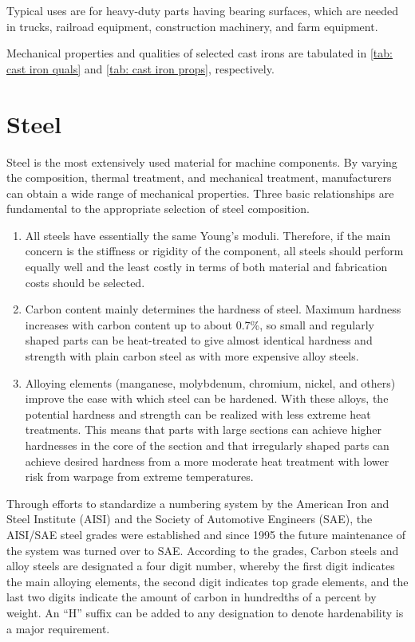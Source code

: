 \documentclass[
10pt,
a4paper,
openany,
svgnames,
]{book}
\begin{document}
Typical uses are for heavy-duty parts having bearing surfaces, which are needed in trucks, railroad equipment, construction machinery, and farm equipment.

Mechanical properties and qualities of selected cast irons are tabulated in \cref{tab: cast iron quals} and \cref{tab: cast iron props}, respectively.

\section{Steel}

Steel is the most extensively used material for machine components. By varying the composition, thermal treatment, and mechanical treatment, manufacturers can obtain a wide range of mechanical properties. Three basic relationships are fundamental to the appropriate selection of steel composition.

\begin{enumerate}
\item All steels have essentially the same Young’s moduli. Therefore, if the main concern is the stiffness or rigidity of the component, all steels should perform equally well and the least costly in terms of both material and fabrication costs should be selected.
\item Carbon content mainly determines the hardness of steel. Maximum hardness increases with carbon content up to about 0.7\%, so small and regularly shaped parts can be heat-treated to give almost identical hardness and strength with plain carbon steel as with more expensive alloy steels.
\item Alloying elements (manganese, molybdenum, chromium, nickel, and others) improve the ease with which steel can be hardened. With these alloys, the potential hardness and strength can be realized with less extreme heat treatments. This means that parts with large sections can achieve higher hardnesses in the core of the section and that irregularly shaped parts can achieve desired hardness from a more moderate heat treatment with lower risk from warpage from extreme temperatures.
\end{enumerate}

Through efforts to standardize a numbering system by the American Iron and Steel Institute (AISI) and the Society of Automotive Engineers (SAE), the AISI/SAE steel grades were established and since 1995 the future maintenance of the system was turned over to SAE. According to the grades, Carbon steels and alloy steels are designated a four digit number, whereby the first digit indicates the main alloying elements, the second digit indicates top grade elements, and the last two digits indicate the amount of carbon in hundredths of a percent by weight. An ``H'' suffix can be added to any designation to denote hardenability is a major requirement.
\end{document}
